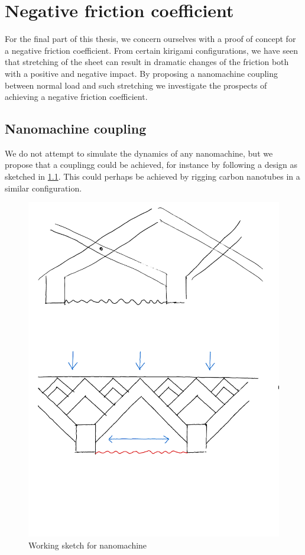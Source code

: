 \chapter{Negative friction coefficient}\label{chap:negative_coef}

For the final part of this thesis, we concern ourselves with a proof of concept for a negative friction coefficient. From certain kirigami configurations, we have seen that stretching of the sheet can result in dramatic changes of the friction both with a positive and negative impact. By proposing a nanomachine coupling between normal load and such stretching we investigate the prospects of achieving a negative friction coefficient. 


\section{Nanomachine coupling}
We do not attempt to simulate the dynamics of any nanomachine, but we propose that a couplingg could be achieved, for instance by following a design as sketched in \cref{fig:nanomachine}. This could perhaps be achieved by rigging carbon nanotubes in a similar configuration. 

\begin{figure}[H]
  \centering
  \includegraphics[width=0.5\linewidth]{figures/negative_coefficient/nanomachine.pdf}
  \caption{Working sketch for nanomachine}
  \label{fig:nanomachine}
\end{figure}

